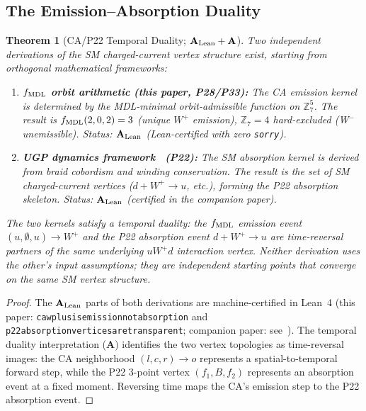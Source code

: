 \documentclass[11pt]{article}
\newtheorem{theorem}{Theorem}[section]
\theoremstyle{remark}
\newcommand{\lean}[1]{%
  \penalty-100
  \begingroup\def\_{\textunderscore\allowbreak}\texttt{#1}\endgroup}
\newcommand{\CatA}{\textbf{A}}
\newcommand{\CatAL}{\ensuremath{\textbf{A}_{\rm Lean}}}
\begin{document}
\subsection{The Emission--Absorption Duality}
\label{sec:emission_absorption_duality}

\begin{theorem}[CA/P22 Temporal Duality; $\CatAL + \CatA$]
\label{thm:emission_absorption_duality}
Two independent derivations of the SM charged-current vertex structure
exist, starting from orthogonal mathematical frameworks:
\begin{enumerate}[nosep,leftmargin=1.5em]
\item \textbf{$f_{\rm MDL}$ orbit arithmetic (this paper, P28/P33):}
  The CA emission kernel is determined by the MDL-minimal
  orbit-admissible function on $\mathbb{Z}_7^5$.
  The result is $f_{\rm MDL}(2,0,2) = 3$ (unique $W^+$ emission),
  $\mathbb{Z}_7 = 4$ hard-excluded (W$^-$ unemissible).
  Status: $\CatAL$ (Lean-certified with zero \texttt{sorry}).
\item \textbf{UGP dynamics framework~\cite{Spivack2026_UGPDynamics} (P22):}
  The SM absorption kernel is derived from braid cobordism and
  winding conservation.
  The result is the set of SM charged-current vertices
  ($d + W^+ \to u$, etc.), forming the P22 absorption skeleton.
  Status: $\CatAL$ (certified in the companion paper).
\end{enumerate}
The two kernels satisfy a \emph{temporal duality}: the $f_{\rm MDL}$ emission
event $(u, \emptyset, u) \to W^+$ and the P22 absorption event
$d + W^+ \to u$ are time-reversal partners of the same underlying
$uW^+d$ interaction vertex.
Neither derivation uses the other's input assumptions; they are
independent starting points that converge on the same SM vertex structure.
\end{theorem}

\begin{proof}
The $\CatAL$ parts of both derivations are machine-certified in
Lean~4 (this paper: \lean{ca\_w\_plus\_is\_emission\_not\_absorption}
and \lean{p22\_absorption\_vertices\_are\_transparent};
companion paper: see~\cite{Spivack2026_UGPDynamics}).
The temporal duality interpretation ($\CatA$) identifies the two vertex
topologies as time-reversal images: the CA neighborhood $(l,c,r) \to o$
represents a spatial-to-temporal forward step, while the P22 3-point vertex
$(f_1, B, f_2)$ represents an absorption event at a fixed moment.
Reversing time maps the CA's emission step to the P22 absorption event.
\end{proof}
\end{document}
